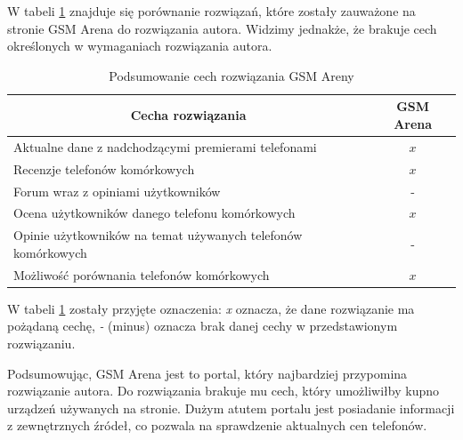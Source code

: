 W tabeli \ref*{comparison_gsm_arena} znajduje się porównanie rozwiązań, które zostały zauważone na stronie GSM Arena do rozwiązania autora. Widzimy jednakże, że brakuje cech określonych w wymaganiach rozwiązania autora.
\begin{table}[H]
    \centering
    \begin{tabular}{|l|c|}
        \hline
        \multicolumn{1}{|c|}{Cecha rozwiązania} & \multicolumn{1}{c|}{GSM Arena} \\ \hline
        Aktualne dane z nadchodzącymi premierami telefonami & $x$ \\ \hline
        Recenzje telefonów komórkowych & $x$ \\ \hline
        Forum wraz z opiniami użytkowników & - \\ \hline
        Ocena użytkowników danego telefonu komórkowych & $x$ \\ \hline
        Opinie użytkowników na temat używanych telefonów komórkowych & - \\ \hline
        Możliwość porównania telefonów komórkowych & $x$ \\ \hline
    \end{tabular}
    \caption{Podsumowanie cech rozwiązania GSM Areny}
    \label{comparison_gsm_arena}
\end{table}
W tabeli \ref*{comparison_gsm_arena} zostały przyjęte oznaczenia: \textit{x} oznacza, że dane rozwiązanie ma pożądaną cechę, \textit{-} (minus) oznacza brak danej cechy w przedstawionym rozwiązaniu.

Podsumowując, GSM Arena jest to portal, który najbardziej przypomina rozwiązanie autora. Do rozwiązania brakuje mu cech, który umożliwiłby kupno urządzeń używanych na stronie. Dużym atutem portalu jest posiadanie informacji z zewnętrznych źródeł, co pozwala na sprawdzenie aktualnych cen telefonów.

